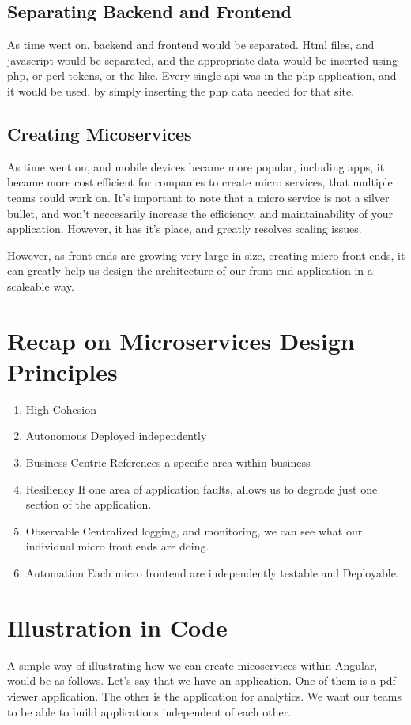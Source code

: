 \subsection{Separating Backend and Frontend}
As time went on, backend and frontend would be separated. Html files, and javascript would be separated, and the appropriate data would be inserted using php, or perl tokens, or the like. Every single api was in the php application, and it would be used, by simply inserting the php data needed for that site. 

\subsection{Creating Micoservices}
As time went on, and mobile devices became more popular, including apps, it became more cost efficient for companies to create micro services, that multiple teams could work on. It's important to note that a micro service is not a silver bullet, and won't neccesarily increase the efficiency, and maintainability of your application. However, it has it's place, and greatly resolves scaling issues. 

However, as front ends are growing very large in size, creating micro front ends, it can greatly help us design the architecture of our front end application in a scaleable way.

\section{Recap on Microservices Design Principles}
\begin{enumerate}
  \item High Cohesion 
  \item Autonomous 
Deployed independently 
  \item Business Centric
References a specific area within business 
  \item Resiliency 
If one area of application faults, allows us to degrade just one section of the application. 
  \item Observable 
Centralized logging, and monitoring, we can see what our individual micro front ends are doing.
  \item Automation 
Each micro frontend are independently testable and Deployable. 
\end{enumerate}

\section{Illustration in Code}
A simple way of illustrating how we can create micoservices within Angular, would be as follows. Let's say that we have an application. One of them is a pdf viewer application. The other is the application for analytics. We want our teams to be able to build applications independent of each other. 

